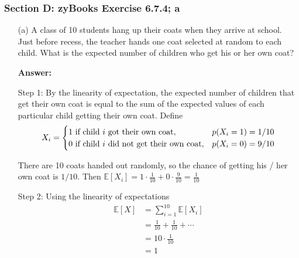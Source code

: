 \documentclass[14pt]{extreport}
\newcommand{\answer}[0]{\medskip \textbf{Answer:} \medskip}
\newcommand{\E}[0]{\mathbb{E}}
\begin{document}
\subsubsection*{Section D: zyBooks Exercise 6.7.4; a}

\begin{enumerate}
    
    \item[(a)] A class of 10 students hang up their coats when they arrive at school. Just before recess, the teacher hands one coat selected at random to each child. What is the expected number of children who get his or her own coat?
    
        \answer

        Step 1: By the linearity of expectation, the expected number of children that get their own coat is equal to the sum of the expected values of each particular child getting their own coat. Define
        \begin{align*}
            X_i = 
            \begin{cases}
                1 \text{ if child \( i \) got their own coat}, & p(X_i = 1) = 1 / 10 \\
                0 \text{ if child \( i \) did not get their own coat}, & p(X_i = 0) = 9 / 10 \\
            \end{cases}
        \end{align*}

        There are 10 coats handed out randomly, so the chance of getting his / her own coat is \( 1 / 10 \). Then \( \E[X_i] = 1 \cdot \frac{1}{10}  + 0 \cdot \frac{9}{10} = \frac{1}{10} \)

        \bigskip

        Step 2: Using the linearity of expectations
        \begin{align*}
            \E[X] &= \sum_{i=1}^{10} \E[X_{i}] \\
                  &= \frac{1}{10} + \frac{1}{10} + \cdots \\
                  &= 10 \cdot \frac{1}{10} \\
                  &= 1
        \end{align*}

\end{enumerate}
\newpage
\end{document}
